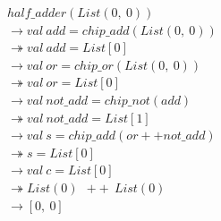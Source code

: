 \documentclass[12pt, a4paper]{article}
\begin{document}
$half\_adder(List(0,~0))$\\
$\rightarrow val~add = chip\_add(List(0,~0))$\\
$\twoheadrightarrow val~add = List[0]$ \\
$\rightarrow val~or = chip\_or(List(0,~0))$\\
$\twoheadrightarrow val~or = List[0]$ \\
$\rightarrow val~not\_add = chip\_not(add)$\\
$\twoheadrightarrow val~not\_add = List[1]$ \\
$\rightarrow val~s = chip\_add(or ++not\_add)$\\
$\twoheadrightarrow s = List[0]$ \\
$\rightarrow val~c = List[0]$\\
$\twoheadrightarrow List(0)~~++~~List(0)$\\
$\rightarrow [0,~0]$\\ \\
\end{document}
